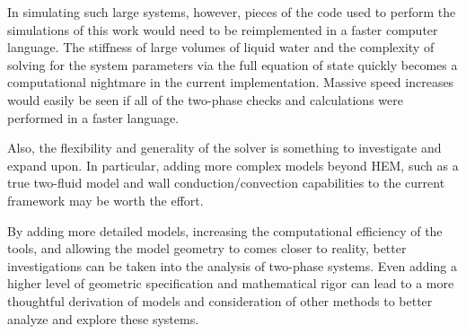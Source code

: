 \documentclass{UWMadThesis}
\begin{document}
In simulating such large systems, however, pieces of the code used to perform the simulations of this work would need to be reimplemented in a faster computer language.
The stiffness of large volumes of liquid water and the complexity of solving for the system parameters via the full equation of state quickly becomes a computational nightmare in the current implementation.
Massive speed increases would easily be seen if all of the two-phase checks and calculations were performed in a faster language.

Also, the flexibility and generality of the solver is something to investigate and expand upon.
In particular, adding more complex models beyond HEM, such as a true two-fluid model and wall conduction/convection capabilities to the current framework may be worth the effort.

By adding more detailed models, increasing the computational efficiency of the tools, and allowing the model geometry to comes closer to reality, better investigations can be taken into the analysis of two-phase systems.
Even adding a higher level of geometric specification and mathematical rigor can lead to a more thoughtful derivation of models and consideration  of other methods to better analyze and explore these systems.




    \cleardoublepage
    
    
    
\end{document}
